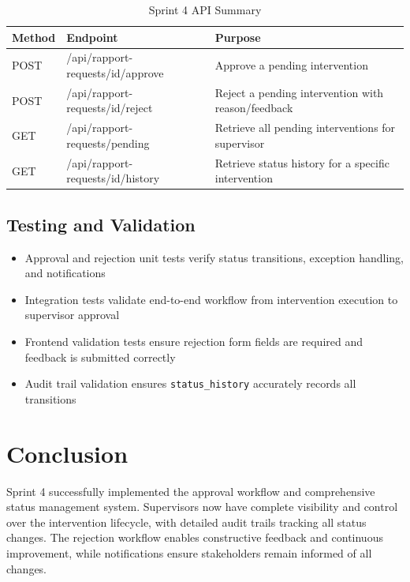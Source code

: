\begin{table}[H]
\centering
\caption{Sprint 4 API Summary}
\label{tab:sprint4_api_summary}
\begin{tabularx}{\textwidth}{|l|l|X|}
\hline
\textbf{Method} & \textbf{Endpoint} & \textbf{Purpose} \\
\hline
POST & /api/rapport-requests/{id}/approve & Approve a pending intervention \\
\hline
POST & /api/rapport-requests/{id}/reject & Reject a pending intervention with reason/feedback \\
\hline
GET & /api/rapport-requests/pending & Retrieve all pending interventions for supervisor \\
\hline
GET & /api/rapport-requests/{id}/history & Retrieve status history for a specific intervention \\
\hline
\end{tabularx}
\end{table}

\subsection{Testing and Validation}

\begin{itemize}
    \item Approval and rejection unit tests verify status transitions, exception handling, and notifications
    \item Integration tests validate end-to-end workflow from intervention execution to supervisor approval
    \item Frontend validation tests ensure rejection form fields are required and feedback is submitted correctly
    \item Audit trail validation ensures \texttt{status\_history} accurately records all transitions
\end{itemize}

\section{Conclusion}

Sprint 4 successfully implemented the approval workflow and comprehensive status management system. Supervisors now have complete visibility and control over the intervention lifecycle, with detailed audit trails tracking all status changes. The rejection workflow enables constructive feedback and continuous improvement, while notifications ensure stakeholders remain informed of all changes.

